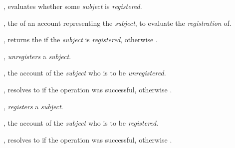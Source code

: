 \begin{interface}
  \begin{functions}
    \item {}, evaluates whether some
      \emph{subject} is \emph{registered}.

      \begin{parameters}
        \item {}, the  of an account
          representing the \emph{subject}, to evaluate the \emph{registration}
          of.
      \end{parameters}

      \begin{returns}
        \item {}, returns the  if the
          \emph{subject} is \emph{registered}, otherwise .
      \end{returns}

    \item {}, \emph{unregisters} a
      \emph{subject}.

      \begin{parameters}
        \item {}, the account  of the
          \emph{subject} who is to be \emph{unregistered}.
      \end{parameters}

      \begin{returns}
        \item {}, resolves to  if the operation was
          successful, otherwise .
      \end{returns}

    \item {}, \emph{registers} a
      \emph{subject}.

      \begin{parameters}
        \item {}, the account  of the
          \emph{subject} who is to be \emph{registered}.
      \end{parameters}

      \begin{returns}
        \item {}, resolves to  if the operation was
          successful, otherwise .
      \end{returns}
  \end{functions}
\end{interface}
